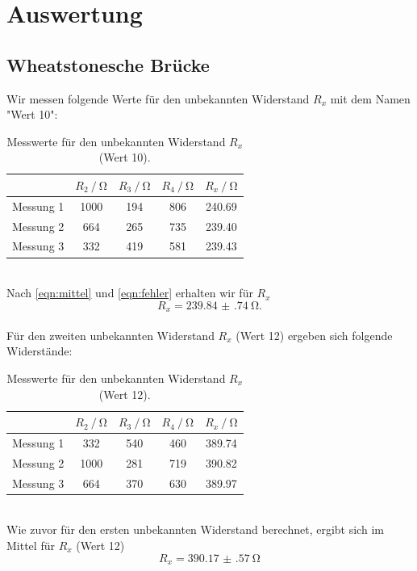 \section{Auswertung}
\subsection{Wheatstonesche Brücke}
Wir messen folgende Werte für den unbekannten Widerstand $R_x$ mit dem Namen "Wert 10":
\begin{table}
  \centering
  \label{tab:r_10}
  \begin{tabular}{c|cccc}
    \toprule
    & {$R_2 \:/\: \si{\ohm}$} & {$R_3\:/\: \si{\ohm}$} & {$R_4\:/\: \si{\ohm}$} & {$R_x\:/\: \si{\ohm}$} \\
    \midrule
    {Messung 1} & 1000 & 194 & 806 & 240.69 \\
    {Messung 2} & 664 & 265 & 735 & 239.40 \\
    {Messung 3} & 332 & 419 & 581 & 239.43 \\
    \bottomrule
  \end{tabular}
  \caption{Messwerte für den unbekannten Widerstand $R_x$ (Wert 10).}
\end{table}
\\
Nach \eqref{eqn:mittel} und \eqref{eqn:fehler} erhalten wir für $R_x$
\begin{equation*}
  R_x = \SI{239.84(74)}{\ohm}.
\end{equation*}
\\
Für den zweiten unbekannten Widerstand $R_x$ (Wert 12) ergeben sich folgende Widerstände:
\begin{table}
  \centering
  \label{tab:r_12}
  \begin{tabular}{c|cccc}
    \toprule
    & {$R_2 \:/\: \si{\ohm}$} & {$R_3\:/\: \si{\ohm}$} & {$R_4\:/\: \si{\ohm}$} & {$R_x\:/\: \si{\ohm}$} \\
    \midrule
  {Messung 1} & 332 & 540 & 460 & 389.74\\
  {Messung 2} & 1000 & 281 & 719 & 390.82\\
  {Messung 3} &  664 & 370 & 630 & 389.97\\
    \bottomrule
  \end{tabular}
  \caption{Messwerte für den unbekannten Widerstand $R_x$ (Wert 12).}
\end{table}
\\
Wie zuvor für den ersten unbekannten Widerstand berechnet, ergibt sich im Mittel für $R_x$ (Wert 12)
\begin{equation*}
  R_x = \SI{390.17(57)}{\ohm}
\end{equation*}

